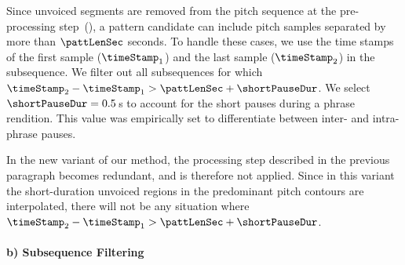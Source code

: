 Since unvoiced segments are removed from the pitch sequence at the pre-processing step~(), a pattern candidate can include pitch samples separated by more than $\pattLenSec$ seconds. To handle these cases, we use the time stamps of the first sample ($\timeStamp_1$) and the last sample ($\timeStamp_2$) in the subsequence. We filter out all subsequences for which $\timeStamp_2-\timeStamp_1 > \pattLenSec + \shortPauseDur$. We select $\shortPauseDur =0.5$\,s to account for the short pauses during a phrase rendition. This value was empirically set to differentiate between inter- and intra-phrase pauses. 

In the new variant of our method, the processing step described in the previous paragraph becomes redundant, and is therefore not applied. Since in this variant the short-duration unvoiced regions in the predominant pitch contours are interpolated, there will not be any situation where $\timeStamp_2-\timeStamp_1 > \pattLenSec + \shortPauseDur$. 


\paragraph{b) Subsequence Filtering} 

